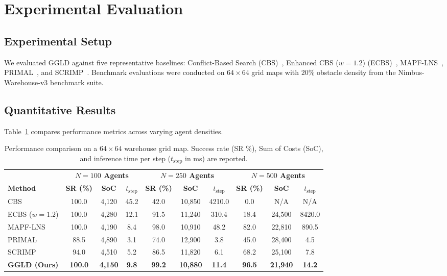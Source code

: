 \documentclass[runningheads]{llncs}
\begin{document}
\section{Experimental Evaluation}

\subsection{Experimental Setup}
We evaluated GGLD against five representative baselines: Conflict-Based Search (CBS)~\cite{sharon2015cbs}, Enhanced CBS ($w=1.2$) (ECBS)~\cite{barer2014ecbs}, MAPF-LNS~\cite{li2021lns}, PRIMAL~\cite{sartoretti2019primal}, and SCRIMP~\cite{wang2023scrimp}. Benchmark evaluations were conducted on $64 \times 64$ grid maps with $20\%$ obstacle density from the Nimbus-Warehouse-v3 benchmark suite.

\subsection{Quantitative Results}
Table~\ref{tab:main_results} compares performance metrics across varying agent densities.

\begin{table}[t]
\caption{Performance comparison on a $64 \times 64$ warehouse grid map. Success rate (SR \%), Sum of Costs (SoC), and inference time per step ($t_{\text{step}}$ in ms) are reported.}
\label{tab:main_results}
\centering
\scriptsize
\setlength{\tabcolsep}{2.2pt}
\begin{tabular}{l ccc ccc ccc}
\toprule
& \multicolumn{3}{c}{\textbf{$N = 100$ Agents}} & \multicolumn{3}{c}{\textbf{$N = 250$ Agents}} & \multicolumn{3}{c}{\textbf{$N = 500$ Agents}} \\
\cmidrule(lr){2-4} \cmidrule(lr){5-7} \cmidrule(lr){8-10}
\textbf{Method} & \textbf{SR (\%)} & \textbf{SoC} & \textbf{$t_{\text{step}}$} & \textbf{SR (\%)} & \textbf{SoC} & \textbf{$t_{\text{step}}$} & \textbf{SR (\%)} & \textbf{SoC} & \textbf{$t_{\text{step}}$} \\
\midrule
CBS            & 100.0 & 4,120 & 45.2 &  42.0 & 10,850 & 4210.0 &   0.0 & N/A & N/A \\
ECBS ($w=1.2$) & 100.0 & 4,280 & 12.1 &  91.5 & 11,240 &  310.4 &  18.4 & 24,500 & 8420.0 \\
MAPF-LNS       & 100.0 & 4,190 &  8.4 &  98.0 & 10,910 &   48.2 &  82.0 & 22,810 &  890.5 \\
PRIMAL         &  88.5 & 4,890 &  3.1 &  74.0 & 12,900 &    3.8 &  45.0 & 28,400 &    4.5 \\
SCRIMP         &  94.0 & 4,510 &  5.2 &  86.5 & 11,820 &    6.1 &  68.2 & 25,100 &    7.8 \\
\midrule
\textbf{GGLD (Ours)} & \textbf{100.0} & \textbf{4,150} & \textbf{9.8} & \textbf{99.2} & \textbf{10,880} & \textbf{11.4} & \textbf{96.5} & \textbf{21,940} & \textbf{14.2} \\
\bottomrule
\end{tabular}
\end{table}
\end{document}
